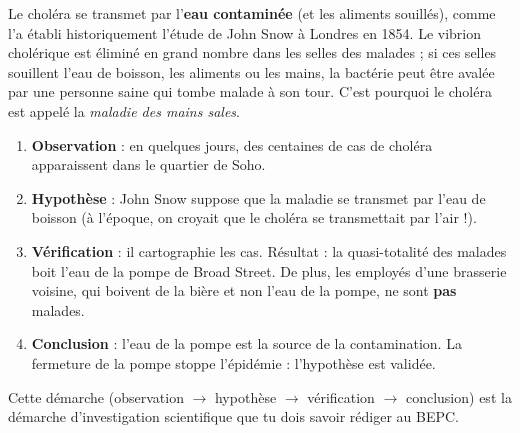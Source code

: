 \documentclass[11pt]{article}
\begin{document}
\begin{propriete}
Le choléra se transmet par l'\textbf{eau contaminée} (et les aliments souillés), comme l'a établi historiquement l'étude de John Snow à Londres en 1854. Le vibrion cholérique est éliminé en grand nombre dans les selles des malades ; si ces selles souillent l'eau de boisson, les aliments ou les mains, la bactérie peut être avalée par une personne saine qui tombe malade à son tour. C'est pourquoi le choléra est appelé la \emph{maladie des mains sales}.
\end{propriete}

\begin{experience}
\begin{enumerate}
\item \textbf{Observation} : en quelques jours, des centaines de cas de choléra apparaissent dans le quartier de Soho.
\item \textbf{Hypothèse} : John Snow suppose que la maladie se transmet par l'eau de boisson (à l'époque, on croyait que le choléra se transmettait par l'air !).
\item \textbf{Vérification} : il cartographie les cas. Résultat : la quasi-totalité des malades boit l'eau de la pompe de Broad Street. De plus, les employés d'une brasserie voisine, qui boivent de la bière et non l'eau de la pompe, ne sont \textbf{pas} malades.
\item \textbf{Conclusion} : l'eau de la pompe est la source de la contamination. La fermeture de la pompe stoppe l'épidémie : l'hypothèse est validée.
\end{enumerate}
Cette démarche (observation $\rightarrow$ hypothèse $\rightarrow$ vérification $\rightarrow$ conclusion) est la démarche d'investigation scientifique que tu dois savoir rédiger au BEPC.
\end{experience}
\end{document}
